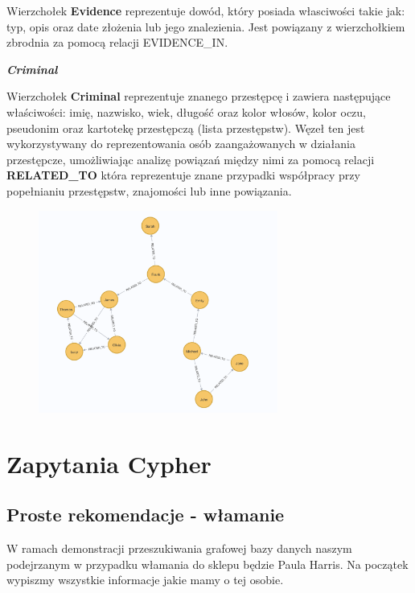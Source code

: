 \documentclass[a4paper,12pt]{article}
\begin{document}
Wierzchołek \textbf{Evidence} reprezentuje dowód, który posiada własciwości takie jak: typ, opis oraz date złożenia lub jego znalezienia. Jest powiązany z wierzchołkiem zbrodnia za pomocą relacji EVIDENCE\_IN.

\begin{center} 
    \textbf{\textit{Criminal}} 
\end{center}

Wierzchołek \textbf{Criminal} reprezentuje znanego przestępcę i zawiera następujące właściwości: imię, nazwisko, wiek, długość oraz kolor włosów, kolor oczu, pseudonim oraz kartotekę przestępczą (lista przestępstw). Węzeł ten jest wykorzystywany do reprezentowania osób zaangażowanych w działania przestępcze, umożliwiając analizę powiązań między nimi za pomocą relacji \textbf{RELATED\_TO} która reprezentuje znane przypadki współpracy przy popełnianiu przestępstw, znajomości lub inne powiązania.

\begin{figure}[h!]
    \centering
    \includegraphics[width=0.7\textwidth]{relations.png} 
\end{figure}

\section{Zapytania Cypher}

\subsection{Proste rekomendacje - włamanie}

W ramach demonstracji przeszukiwania grafowej bazy danych naszym podejrzanym w przypadku włamania do sklepu będzie Paula Harris. Na początek wypiszmy wszystkie informacje jakie mamy o tej osobie.
\end{document}
